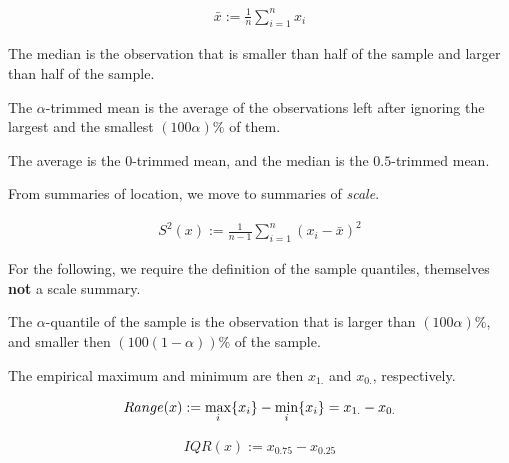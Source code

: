 \documentclass[12pt,a4paper]{report}
\begin{document}
\begin{definition}
\begin{align}
	\bar{x}:= \frac{1}{n}\sum_{i=1}^{n} x_i
\end{align}
\end{definition}

\begin{definition}
The median is the observation that is smaller than half of the sample and larger than half of the sample.
\end{definition}

\begin{definition}
The $\alpha$-trimmed mean is the average of the observations left after ignoring the largest and the smallest $(100\alpha) \%$ of them.
\end{definition}
The \naive average is the $0$-trimmed mean, and the median is the $0.5$-trimmed mean.

From summaries of location, we move to summaries of \emph{scale}. 

\begin{definition}
\begin{align}
	S^2(x):= \frac{1}{n-1} \sum_{i=1}^{n} (x_i-\bar{x})^2
\end{align}
\end{definition}

For the following, we require the definition of the sample quantiles, themselves \textbf{not} a scale summary.

\begin{definition}
The $\alpha$-quantile of the sample is the observation that is larger than $(100\alpha)\%$, and smaller then  $(100(1-\alpha))\%$ of the sample. 
\end{definition}
The empirical maximum and minimum are then $x_{1.}$ and $x_{0.}$, respectively.


\begin{definition}
\begin{align}
	Range(x):= \max_i\{ x_i \}-\min_i\{ x_i \}= x_{1.}-x_{0.}
\end{align}
\end{definition}

\begin{definition}
\begin{align}
	IQR(x):= x_{0.75}-x_{0.25}
\end{align}
\end{definition}
\end{document}
